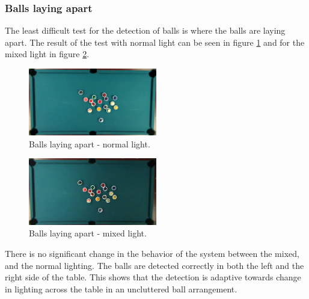 \subsubsection{Balls laying apart}
The least difficult test for the detection of balls is where the balls are laying apart. The result of the test with normal light can be seen in figure \ref{fig:apartnormal} and for the mixed light in figure \ref{fig:apartmixed}.

\begin{figure}[H]
  \centering
\includegraphics[width=0.5\textwidth]{images/test/light1/laying-apart}
   \caption{Balls laying apart - normal light.}
  \label{fig:apartnormal}
\end{figure}

\begin{figure}[H]
  \centering
\includegraphics[width=0.5\textwidth]{images/test/mixed1/laying-apart}
   \caption{Balls laying apart - mixed light.}
  \label{fig:apartmixed}
\end{figure}

There is no significant change in the behavior of the system between the mixed, and the normal lighting. The balls are detected correctly in both the left and the right side of the table. This shows that the detection is adaptive towards change in lighting across the table in an uncluttered ball arrangement.

